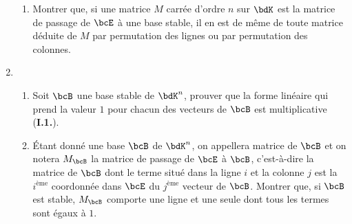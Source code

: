 \documentclass[a4paper,french,bookmarks]{article}
\begin{document}
\begin{enumerate}
\begin{enumerate}
            \item Montrer que, si une matrice $M$ carrée d'ordre $n$ sur $\bdK$ est la matrice de passage de $\bcE$ à une base stable, il en est de même de toute matrice déduite de $M$ par permutation des lignes ou par permutation des colonnes.
            
        \end{enumerate}
        
        \item \begin{enumerate}
            \item Soit $\bcB$ une base stable de $\bdK^n$, prouver que la forme linéaire qui prend la valeur $1$ pour chacun des vecteurs de $\bcB$ est multiplicative (\cf \textbf{\color{white5!60!black}\sffamily I.1.}).
            
            \noafter
            \nobefore\yesafter
            \boxansconc{
                \[ \varphi\p{xy} = \sum_{i=1}^n \sum_{j=1}^n x_iy_i\varphi\p{v_i}\varphi\p{v_j} = \p{\sum_{i=1}^n x_i\varphi\p{v_i}}\p{\sum_{j=1}^n x_j\varphi\p{v_j}} = \varphi\p{x}\varphi\p{y}\]
            }
            \yesbefore
            
            \item Étant donné une base $\bcB$ de $\bdK^n$, on appellera matrice de $\bcB$ et on notera $M_\bcB$ la matrice de passage de $\bcE$ à $\bcB$, c'est-à-dire la matrice de $\bcB$ dont le terme situé dans la ligne $i$ et la colonne $j$ est la $i^\text{ème}$ coordonnée dans $\bcE$ du $j^\text{ème}$ vecteur de $\bcB$. Montrer que, si $\bcB$ est stable, $M_\bcB$ comporte une ligne et une seule dont tous les termes sont égaux à $1$.
            

\end{enumerate}
\end{enumerate}
\end{document}
